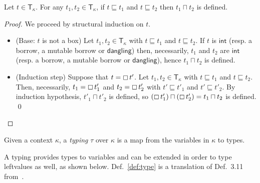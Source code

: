 \begin{lemma}\label{lemma:technical-type}
  Let $t\in\mathsf{T}_\kappa$. For any $t_1,t_2\in\mathsf{T}_\kappa$,
  if $t\sqsubseteq t_1$ and $t\sqsubseteq t_2$ then $t_1\sqcap t_2$ is defined.
\end{lemma}
\begin{proof}
  We proceed by structural induction on $t$.
  \begin{itemize}
    \item (Base: $t$ is not a box)
    Let $t_1,t_2\in\mathsf{T}_\kappa$ with $t\sqsubseteq t_1$ and $t\sqsubseteq t_2$.
    If $t$ is $\mathsf{int}$ (resp. a borrow, a mutable borrow or $\mathsf{dangling}$)
    then, necessarily, $t_1$ and $t_2$ are $\mathsf{int}$ (resp. a borrow,
    a mutable borrow or $\mathsf{dangling}$), hence $t_1\sqcap t_2$ is defined.
    \item (Induction step) Suppose that $t = \boxempty\,{t'}$.
    Let $t_1,t_2\in\mathsf{T}_\kappa$ with $t\sqsubseteq t_1$ and $t\sqsubseteq t_2$.
    Then, necessarily, $t_1 = \boxempty\,{t'_1}$ and $t_2 = \boxempty\,{t'_2}$
    with $t'\sqsubseteq t'_1$ and $t'\sqsubseteq t'_2$. By induction
    hypothesis, $t'_1\sqcap t'_2$ is defined, so
    $(\boxempty\,{t'_1}) \sqcap (\boxempty\,{t'_2}) = t_1 \sqcap t_2$ is defined.
    \qed
  \end{itemize}
\end{proof}

\begin{definition}[Typing]\label{def:typing}
  Given a context $\kappa$, a \emph{typing} $\tau$ over $\kappa$ is
  a map from the variables in $\kappa$ %
  to types.
\end{definition}

A typing provides types to variables and can be extended in order to type
leftvalues as well, as shown below. Def.~\ref{def:type} is a translation of
Def.~3.11 from~\cite{Pearce21}.

